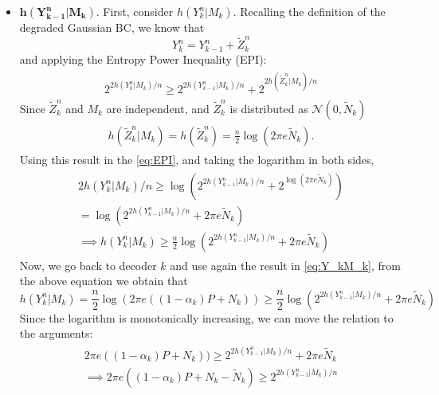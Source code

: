 \begin{itemize}
  \item $\mathbf{h(Y_{k-1}^n|M_{k})}$. First, consider $h(Y_k^n|M_k)$. Recalling the definition of the degraded Gaussian BC, we know that
  \begin{equation}
      Y^n_k = Y^n_{k-1}+\tilde{Z}^n_k
  \end{equation}
  and applying the Entropy Power Inequality (EPI):
  \begin{align}
    \begin{split}
      2^{2h(Y^n_k|M_k)/n}\geq 2^{2h(Y^n_{k-1}|M_k)/n}+2^{2h(\tilde{Z}^n_{k}|M_k)/n}
    \end{split}
    \label{eq:EPI}
  \end{align}
  Since $\tilde{Z}^n_k$ and $M_k$ are independent, and $\tilde{Z}^n_k$ is distributed as $\mathcal{N}(0,\tilde{N}_k)$
  \begin{align}
    \begin{split}
      h(\tilde{Z}^n_{k}|M_k) = h(\tilde{Z}^n_{k}) = \frac{n}{2}\log\left(2\pi e \tilde{N}_k\right).
    \end{split}
  \end{align}
  Using this result in the \eqref{eq:EPI}, and taking the logarithm in both sides,
  \begin{align}
    \begin{split}
      2h(Y^n_k|M_k)/n\geq \log\left(2^{2h(Y^n_{k-1}|M_k)/n}+2^{\log\left(2\pi e \tilde{N}_k\right)}\right) \\
      = \log\left(2^{2h(Y^n_{k-1}|M_k)/n}+2\pi e \tilde{N}_k\right)\\
      \implies h(Y^n_k|M_k)\geq \frac{n}{2}\log\left(2^{2h(Y^n_{k-1}|M_k)/n}+2\pi e \tilde{N}_k\right)
    \end{split}
  \end{align}
  Now, we go back to decoder $k$ and use again the result in \eqref{eq:Y_kM_k}, from the above equation we obtain that
  \begin{equation}
    h(Y_k^n|M_k) = \frac{n}{2}\log(2\pi e ((1-\alpha_k) P+N_k))\geq \frac{n}{2}\log\left(2^{2h(Y^n_{k-1}|M_k)/n}+2\pi e \tilde{N}_k\right)
  \end{equation}
  Since the logarithm is monotonically increasing, we can move the relation to the arguments:
  \begin{align}
    \begin{split}
      2\pi e ((1-\alpha_k) P+N_k))\geq 2^{2h(Y^n_{k-1}|M_k)/n}+2\pi e \tilde{N}_k\\
      \implies
      2\pi e ((1-\alpha_k) P+N_k-\tilde{N}_k)\geq 2^{2h(Y^n_{k-1}|M_k)/n}\\

\end{split}
\end{align}
\end{itemize}
